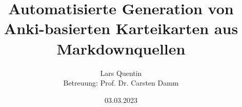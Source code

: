 \title{Automatisierte Generation von Anki-basierten Karteikarten aus Markdownquellen}
\author{Lars Quentin\\ Betreuung: Prof. Dr. Carsten Damm}
\date{03.03.2023}

